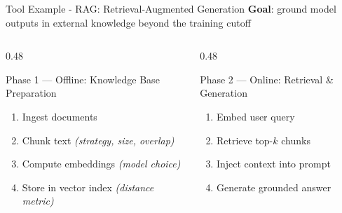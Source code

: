 \begin{frame}{Tool Example - RAG: Retrieval-Augmented Generation}
\textbf{Goal}: ground model outputs in external knowledge beyond the training cutoff\\[0.4em]

\vspace{0.4em}
\begin{columns}[T]
\begin{column}{0.48\textwidth}
\begin{block}{Phase 1 — Offline: Knowledge Base Preparation}
\begin{enumerate}
  \item Ingest documents
  \item Chunk text \textit{(strategy, size, overlap)}
  \item Compute embeddings \textit{(model choice)}
  \item Store in vector index \textit{(distance metric)}
\end{enumerate}
\vspace{0.2em}
\end{block}
\end{column}
\begin{column}{0.48\textwidth}
\begin{block}{Phase 2 — Online: Retrieval \& Generation}
\begin{enumerate}
  \item Embed user query
  \item Retrieve top-$k$ chunks 
  \item Inject context into prompt
  \item Generate grounded answer 
\end{enumerate}
\end{block}
\end{column}
\end{columns}
\vspace{0.4em}

\end{frame}

